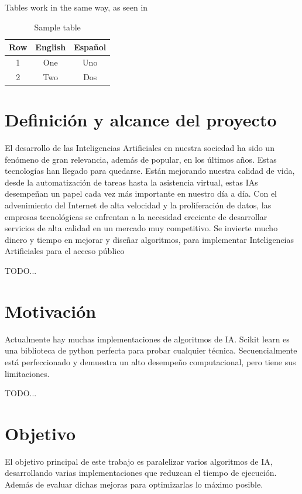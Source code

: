 		Tables work in the same way, as seen in 

		\begin{table}
			\centering
			\begin{tabular}{c|c|c}
				Row & English & Español \\\hline\hline
				1 & One & Uno \\
				2 & Two & Dos \\
			\end{tabular}
			\caption{Sample table}
			\label{tab:tabla}
		\end{table}
	\blindtext
	
	\newpage %
	\section{Definición y alcance del proyecto}
		El desarrollo de las Inteligencias Artificiales en nuestra sociedad ha sido un fenómeno de gran relevancia, además de popular, en los últimos años. Estas tecnologías han llegado para quedarse. Están mejorando nuestra calidad de vida, desde la automatización de tareas hasta la asistencia virtual, estas IAs desempeñan un papel cada vez más importante en nuestro día a día.
		Con el advenimiento del Internet de alta velocidad y la proliferación de datos, las empresas tecnológicas se enfrentan a la necesidad creciente de desarrollar servicios de alta calidad en un mercado muy competitivo. Se invierte mucho dinero y tiempo en mejorar y diseñar algoritmos, para implementar Inteligencias Artificiales para el acceso público
		
		TODO...
	
	\newpage  %
	\section{Motivación}
		Actualmente hay muchas implementaciones de algoritmos de IA. Scikit learn es una biblioteca de python perfecta para probar cualquier técnica. Secuencialmente está perfeccionado y demuestra un alto desempeño computacional, pero tiene sus limitaciones. 
		
		TODO...
		
	
	\newpage  %
	\section{Objetivo}
		El objetivo principal de este trabajo es paralelizar varios algoritmos de IA, desarrollando varias implementaciones que reduzcan el tiempo de ejecución. Además de evaluar dichas mejoras para optimizarlas lo máximo posible.	
		
